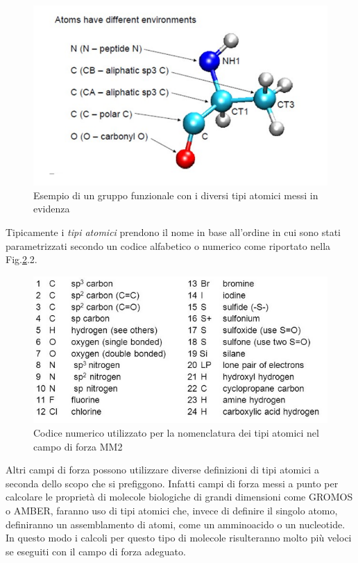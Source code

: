\documentclass[oneside]{amsbook}
\numberwithin{section}{chapter}
\numberwithin{equation}{section}
\numberwithin{figure}{section}
\begin{document}
\begin{figure} [H]
\label{atomty}
\centering
\caption{Esempio di un gruppo funzionale con i diversi tipi atomici  messi in evidenza}
\includegraphics[scale=0.2]{tipiAtomici}
\end{figure}

Tipicamente i \emph{tipi atomici} prendono il nome in base all'ordine in cui sono stati parametrizzati secondo un codice alfabetico o numerico come riportato nella Fig.\ref{mm2at}.2.

\begin{figure} [H]
\label{mm2at}
\centering
\caption{Codice numerico utilizzato per la nomenclatura dei tipi atomici  nel campo di forza MM2}
\includegraphics[scale=0.3]{mm2at}
\end{figure}
Altri campi di forza possono utilizzare diverse definizioni di tipi  atomici a seconda dello scopo che si prefiggono. Infatti campi di forza messi a punto per calcolare le proprietà di molecole biologiche di grandi dimensioni come GROMOS o AMBER, faranno uso di tipi atomici che, invece di definire il singolo atomo, definiranno un assemblamento di atomi, come un amminoacido o un nucleotide. In questo modo i calcoli per questo tipo di molecole risulteranno molto più veloci se eseguiti con il campo di forza adeguato.
\end{document}
